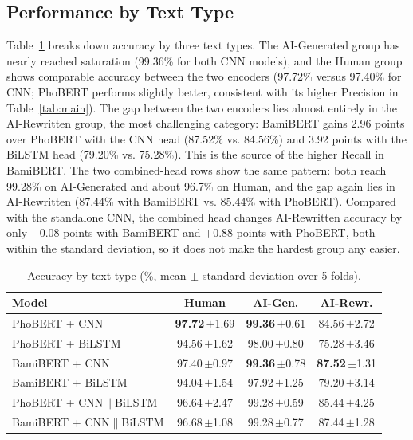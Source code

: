 \documentclass[conference,a4paper]{IEEEtran}
\newcommand{\pmv}[2]{#1\,{\scriptsize$\pm$#2}}
\begin{document}
\subsection{Performance by Text Type}
Table~\ref{tab:bytype} breaks down accuracy by three text types. The AI-Generated group has nearly reached saturation (99.36\% for both CNN models), and the Human group shows comparable accuracy between the two encoders (97.72\% versus 97.40\% for CNN; PhoBERT performs slightly better, consistent with its higher Precision in Table~\ref{tab:main}). The gap between the two encoders lies almost entirely in the AI-Rewritten group, the most challenging category: BamiBERT gains 2.96 points over PhoBERT with the CNN head (87.52\% vs. 84.56\%) and 3.92 points with the BiLSTM head (79.20\% vs. 75.28\%). This is the source of the higher Recall in BamiBERT. The two combined-head rows show the same pattern: both reach 99.28\% on AI-Generated and about 96.7\% on Human, and the gap again lies in AI-Rewritten (87.44\% with BamiBERT vs. 85.44\% with PhoBERT). Compared with the standalone CNN, the combined head changes AI-Rewritten accuracy by only $-$0.08 points with BamiBERT and $+$0.88 points with PhoBERT, both within the standard deviation, so it does not make the hardest group any easier. 
\begin{table}[t]
  \centering
  \caption{Accuracy by text type (\%, mean $\pm$ standard deviation over 5 folds).}
  \label{tab:bytype}
  \setlength{\tabcolsep}{4pt}
  \begin{tabular}{lccc}
    \toprule
    Model & Human & AI-Gen. & AI-Rewr. \\
    \midrule
    PhoBERT + CNN     & \pmv{\textbf{97.72}}{1.69} & \pmv{\textbf{99.36}}{0.61} & \pmv{84.56}{2.72} \\
    PhoBERT + BiLSTM  & \pmv{94.56}{1.62} & \pmv{98.00}{0.80} & \pmv{75.28}{3.46} \\
    BamiBERT + CNN    & \pmv{97.40}{0.97} & \pmv{\textbf{99.36}}{0.78} & \pmv{\textbf{87.52}}{1.31} \\
    BamiBERT + BiLSTM & \pmv{94.04}{1.54} & \pmv{97.92}{1.25} & \pmv{79.20}{3.14} \\
    \midrule
    {\scriptsize PhoBERT + CNN$\|$BiLSTM} & \pmv{96.64}{2.47} & \pmv{99.28}{0.59} & \pmv{85.44}{4.25} \\
    {\scriptsize BamiBERT + CNN$\|$BiLSTM} & \pmv{96.68}{1.08} & \pmv{99.28}{0.77} & \pmv{87.44}{1.28} \\
    \bottomrule
  \end{tabular}
\end{table}
\end{document}
